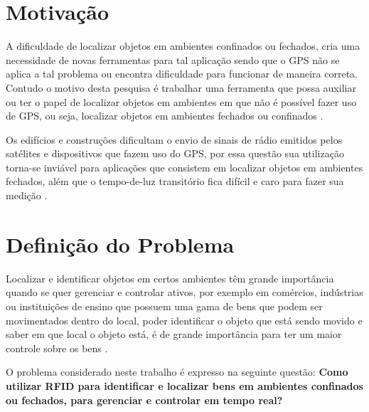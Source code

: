 

 \section{Motivação}
A dificuldade de localizar objetos em ambientes confinados ou fechados, cria uma necessidade de novas ferramentas para tal aplicação sendo que o GPS não se aplica a tal problema ou encontra dificuldade para funcionar de maneira correta. Contudo o motivo desta pesquisa é trabalhar uma ferramenta que possa auxiliar ou ter o papel de localizar objetos em ambientes em que não é possível fazer uso de GPS, ou seja, localizar objetos em ambientes fechados ou confinados \cite{mechanismRFID2006}.

\par
Os edifícios e construções dificultam o envio de sinais de rádio emitidos pelos satélites e dispositivos que fazem uso do GPS, por essa questão sua utilização torna-se inviável para aplicações que consistem em localizar objetos em ambientes fechados, além que o tempo-de-luz transitório fica difícil e caro para fazer sua medição \cite{rfid2009review}.

\section{Definição do Problema}

Localizar e identificar objetos em certos ambientes têm grande importância quando se quer gerenciar e controlar ativos, por exemplo em comércios, indústrias ou instituições de ensino que possuem uma gama de bens que podem ser movimentados dentro do local,  poder identificar o objeto que está sendo movido e saber em que local o objeto está, é de grande importância para ter um maior controle sobre os bens \cite{realtimeRFID2016}. 

\par
O problema considerado neste trabalho é expresso na seguinte questão: \textbf{ Como utilizar RFID para identificar e localizar bens em ambientes confinados ou fechados, para gerenciar e controlar em tempo real?}
